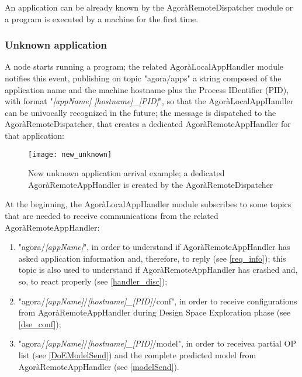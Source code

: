 An application can be already known by the AgoràRemoteDispatcher module or a program is executed by a machine for the first time.

\subsubsection{Unknown application}

A node starts running a program; the related AgoràLocalAppHandler module notifies this event, publishing on topic "agora/apps" a string composed of the application name and the machine hostname plus the Process IDentifier (PID), with format "\textit{[appName] [hostname]\_[PID]}", so that the AgoràLocalAppHandler can be univocally recognized in the future; the message is dispatched to the AgoràRemoteDispatcher, that creates a dedicated AgoràRemoteAppHandler for that application:

\begin{figure}[H]

    \centering
    \texttt{[image: new\_unknown]}
    \caption{New unknown application arrival example; a dedicated AgoràRemoteAppHandler is created by the AgoràRemoteDispatcher}
    
\end{figure}

At the beginning, the AgoràLocalAppHandler module subscribes to some topics that are needed to receive communications from the related AgoràRemoteAppHandler:

\begin{enumerate}

    \item "agora/\textit{[appName]}", in order to understand if AgoràRemoteAppHandler has asked application information and, therefore, to reply (see \ref{req_info}); this topic is also used to understand if AgoràRemoteAppHandler has crashed and, so, to react properly (see \ref{handler_disc});
    
    \item "agora/\textit{[appName]}/\textit{[hostname]\_[PID]}/conf", in order to receive configurations from AgoràRemoteAppHandler during Design Space Exploration phase (see \ref{dse_conf});
    
    \item "agora/\textit{[appName]}/\textit{[hostname]\_[PID]}/model", in order to receive\linebreak a partial OP list (see \ref{DoEModelSend}) and the complete predicted model from AgoràRemoteAppHandler (see \ref{modelSend}).

\end{enumerate}

